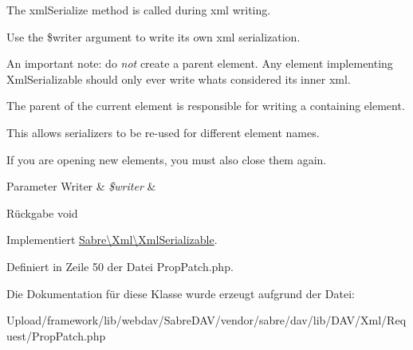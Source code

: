 The xml\+Serialize method is called during xml writing.

Use the \$writer argument to write its own xml serialization.

An important note\+: do {\itshape not} create a parent element. Any element implementing Xml\+Serializable should only ever write what\textquotesingle{}s considered its \textquotesingle{}inner xml\textquotesingle{}.

The parent of the current element is responsible for writing a containing element.

This allows serializers to be re-\/used for different element names.

If you are opening new elements, you must also close them again.


\begin{DoxyParams}[1]{Parameter}
Writer & {\em \$writer} & \\
\hline
\end{DoxyParams}
\begin{DoxyReturn}{Rückgabe}
void 
\end{DoxyReturn}


Implementiert \mbox{\hyperlink{interface_sabre_1_1_xml_1_1_xml_serializable_aa78f3ee43aa699be8347181653a53d8c}{Sabre\textbackslash{}\+Xml\textbackslash{}\+Xml\+Serializable}}.



Definiert in Zeile 50 der Datei Prop\+Patch.\+php.



Die Dokumentation für diese Klasse wurde erzeugt aufgrund der Datei\+:\begin{DoxyCompactItemize}
\item 
Upload/framework/lib/webdav/\+Sabre\+D\+A\+V/vendor/sabre/dav/lib/\+D\+A\+V/\+Xml/\+Request/Prop\+Patch.\+php\end{DoxyCompactItemize}
